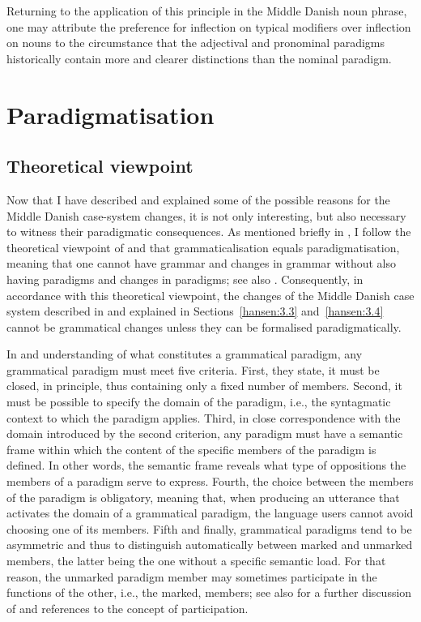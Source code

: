 \documentclass[output=paper]{langsci/langscibook}
\begin{document}
\z

\begin{sloppypar}
Returning to the application of this principle in the Middle Danish noun phrase, one may attribute the preference for inflection on typical modifiers over inflection on nouns to the circumstance that the adjectival and pronominal paradigms historically contain more and clearer distinctions than the nominal paradigm.
\end{sloppypar}

\section{Paradigmatisation} \label{hansen:4}\largerpage
\subsection{Theoretical viewpoint} \label{hansen:4.1}

Now that I have described and explained some of the possible reasons for the Middle Danish case-system changes, it is not only interesting, but also necessary to witness their paradigmatic consequences. As mentioned briefly in , I follow the theoretical viewpoint of \citet[xi, 71–72]{Nørgård-Sørensen2011} and \citet[261–262]{Nørgård-Sørensen2015} that grammaticalisation equals paradigmatisation, meaning that one cannot have grammar and changes in grammar without also having paradigms and changes in paradigms; see also \citet[2--4]{DiewaldSmirnova2010}. Consequently, in accordance with this theoretical viewpoint, the changes of the Middle Danish case system described in  and explained in Sections~\ref{hansen:3.3} and~\ref{hansen:3.4} cannot be grammatical changes unless they can be formalised paradigmatically.

In \citet[5--6]{Nørgård-Sørensen2011} and \citet[262--263]{Nørgård-Sørensen2015} understanding of what constitutes a grammatical paradigm, any grammatical paradigm must meet five criteria. First, they state, it must be closed, in principle, thus containing only a fixed number of members. Second, it must be possible to specify the domain of the paradigm, i.e., the syntagmatic context to which the paradigm applies. Third, in close correspondence with the domain introduced by the second criterion, any paradigm must have a semantic frame within which the content of the specific members of the paradigm is defined. In other words, the semantic frame reveals what type of oppositions the members of a paradigm serve to express. Fourth, the choice between the members of the paradigm is obligatory, meaning that, when producing an utterance that activates the domain of a grammatical paradigm, the language users cannot avoid choosing one of its members. Fifth and finally, grammatical paradigms tend to be asymmetric and thus to distinguish automatically between marked and unmarked members, the latter being the one without a specific semantic load. For that reason, the unmarked paradigm member may sometimes participate in the functions of the other, i.e., the marked, members; see also  for a further discussion of and references to the concept of participation.
\end{document}
